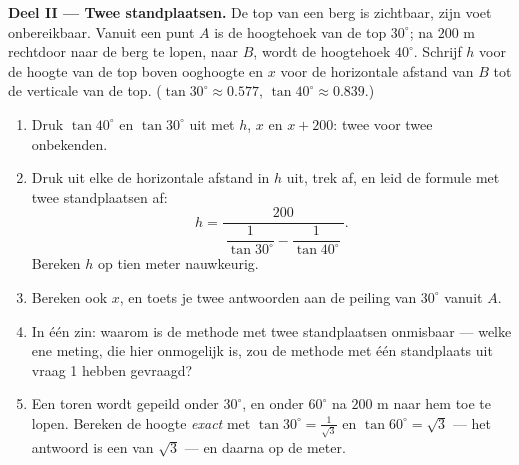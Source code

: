 \begin{problem}
\medskip
\noindent\textbf{Deel II --- Twee standplaatsen.}
De top van een berg is zichtbaar, zijn voet onbereikbaar. Vanuit een punt $A$ is de
hoogtehoek van de top $30^\circ$; na $200$ m rechtdoor naar de berg te lopen, naar
$B$, wordt de hoogtehoek $40^\circ$. Schrijf $h$ voor de hoogte van de top boven
ooghoogte en $x$ voor de horizontale afstand van $B$ tot de verticale van de top.
($\tan 30^\circ \approx 0.577$, $\tan 40^\circ \approx 0.839$.)
\begin{enumerate}[resume]
  \item Druk $\tan 40^\circ$ en $\tan 30^\circ$ uit met $h$, $x$ en $x + 200$: twee
         voor twee onbekenden.
  \item Druk uit elke  de horizontale afstand in $h$ uit, trek af, en
        leid de formule met twee standplaatsen af:
        \[
        h = \frac{200}
        {\ \dfrac{1}{\tan 30^\circ} - \dfrac{1}{\tan 40^\circ}\ } .
        \]
        Bereken $h$ op tien meter nauwkeurig.
  \item Bereken ook $x$, en toets je twee antwoorden aan de peiling van $30^\circ$
        vanuit $A$.
  \item In één zin: waarom is de methode met twee standplaatsen onmisbaar --- welke
        ene meting, die hier onmogelijk is, zou de methode met één standplaats uit
        vraag 1 hebben gevraagd?
  \item Een toren wordt gepeild onder $30^\circ$, en onder $60^\circ$ na $200$ m
        naar hem toe te lopen. Bereken de hoogte \emph{exact} met
        $\tan 30^\circ = \frac{1}{\sqrt3}$ en $\tan 60^\circ = \sqrt3$ --- het
        antwoord is een  van $\sqrt3$ --- en daarna op de meter.
\end{enumerate}


\end{problem}

